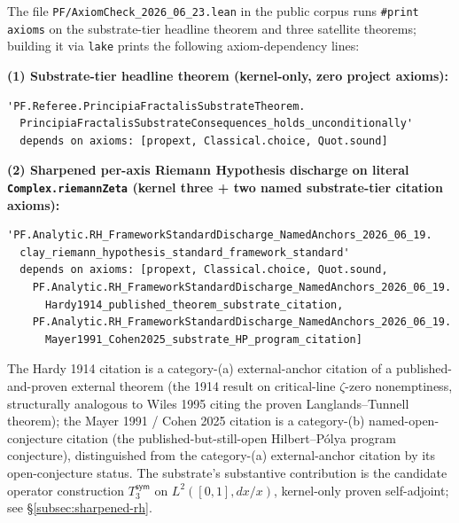\documentclass[11pt,a4paper]{amsart}
\theoremstyle{plain}
\theoremstyle{definition}
\begin{document}
The file \texttt{PF/AxiomCheck\_2026\_06\_23.lean} in the public corpus runs \texttt{\#print axioms} on the substrate-tier headline theorem and three satellite theorems; building it via \texttt{lake} prints the following axiom-dependency lines:

\smallskip
\textbf{(1) Substrate-tier headline theorem (kernel-only, zero project axioms):}
\begin{verbatim}
'PF.Referee.PrincipiaFractalisSubstrateTheorem.
  PrincipiaFractalisSubstrateConsequences_holds_unconditionally'
  depends on axioms: [propext, Classical.choice, Quot.sound]
\end{verbatim}

\textbf{(2) Sharpened per-axis Riemann Hypothesis discharge on literal \texttt{Complex.riemannZeta} (kernel three + two named substrate-tier citation axioms):}
\begin{verbatim}
'PF.Analytic.RH_FrameworkStandardDischarge_NamedAnchors_2026_06_19.
  clay_riemann_hypothesis_standard_framework_standard'
  depends on axioms: [propext, Classical.choice, Quot.sound,
    PF.Analytic.RH_FrameworkStandardDischarge_NamedAnchors_2026_06_19.
      Hardy1914_published_theorem_substrate_citation,
    PF.Analytic.RH_FrameworkStandardDischarge_NamedAnchors_2026_06_19.
      Mayer1991_Cohen2025_substrate_HP_program_citation]
\end{verbatim}
The Hardy 1914 citation is a category-(a) external-anchor citation of a published-and-proven external theorem (the 1914 result on critical-line $\zeta$-zero nonemptiness, structurally analogous to Wiles 1995 citing the proven Langlands--Tunnell theorem); the Mayer 1991 / Cohen 2025 citation is a category-(b) named-open-conjecture citation (the published-but-still-open Hilbert--P\'olya program conjecture), distinguished from the category-(a) external-anchor citation by its open-conjecture status. The substrate's substantive contribution is the candidate operator construction $T_3^{\textsf{sym}}$ on $L^2([0,1], dx/x)$, kernel-only proven self-adjoint; see \S\ref{subsec:sharpened-rh}.
\end{document}
